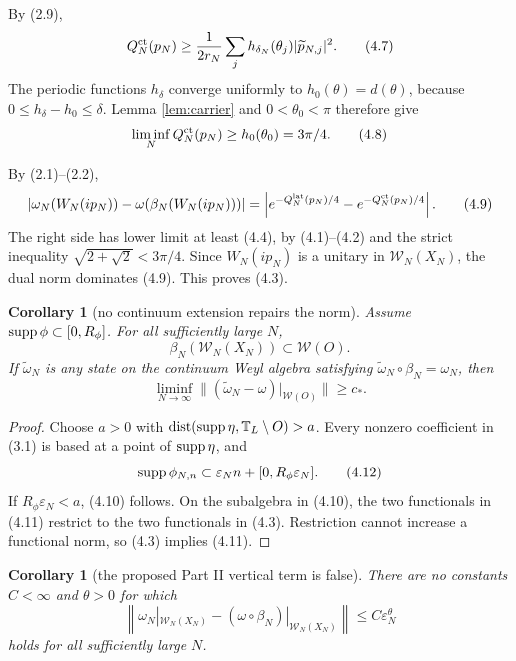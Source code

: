 \documentclass[11pt,a4paper]{article}
\newcommand{\T}{\mathbb T}
\newcommand{\W}{\mathcal W}
\newcommand{\eps}{\varepsilon}
\newtheorem{corollary}[theorem]{Corollary}
\begin{document}

By (2.9),
\[
 Q_N^{\rm ct}(p_N)
 \geq\frac1{2r_N}\sum_jh_{\delta_N}(\theta_j)
       |\widetilde p_{N,j}|^2.                                  \tag{4.7}
\]
The periodic functions $h_\delta$ converge uniformly to
$h_0(\theta)=d(\theta)$, because
$0\leq h_\delta-h_0\leq\delta$.  Lemma \ref{lem:carrier} and
$0<\theta_0<\pi$ therefore give
\[
 \liminf_NQ_N^{\rm ct}(p_N)\geq h_0(\theta_0)=3\pi/4.           \tag{4.8}
\]


By (2.1)--(2.2),
\[
 \left|\omega_N(W_N(ip_N))-\omega(\beta_N(W_N(ip_N)))\right|
 =\left|e^{-Q_N^{\rm lat}(p_N)/4}-e^{-Q_N^{\rm ct}(p_N)/4}\right|.
                                                                    \tag{4.9}
\]
The right side has lower limit at least (4.4), by (4.1)--(4.2) and the strict
inequality $\sqrt{2+\sqrt2}<3\pi/4$.  Since $W_N(ip_N)$ is a unitary in
$\W_N(X_N)$, the dual norm dominates (4.9).  This proves (4.3). \QedStep

\begin{corollary}[no continuum extension repairs the norm]\label{cor:extension}
Assume $\operatorname{supp}\phi\subset[0,R_\phi]$.  For all sufficiently large $N$,
\[
 \beta_N(\W_N(X_N))\subset\W(O).                                \tag{4.10}
\]
If $\widetilde\omega_N$ is any state on the continuum Weyl algebra satisfying
$\widetilde\omega_N\circ\beta_N=\omega_N$, then
\[
 \liminf_{N\to\infty}
 \| (\widetilde\omega_N-\omega)|_{\W(O)}\|\geq c_*.            \tag{4.11}
\]
\end{corollary}

\begin{proof}
Choose $a>0$ with $\dist(\supp\eta,\T_L\setminus O)>a$.  Every nonzero
coefficient in (3.1) is based at a point of $\operatorname{supp}\eta$, and
\[
 \supp\phi_{N,n}\subset\eps_Nn+[0,R_\phi\eps_N].               \tag{4.12}
\]
If $R_\phi\eps_N<a$, (4.10) follows.  On the subalgebra in (4.10), the two
functionals in (4.11) restrict to the two functionals in (4.3).  Restriction cannot
increase a functional norm, so (4.3) implies (4.11).
\end{proof}

\begin{corollary}[the proposed Part II vertical term is false]\label{cor:false-target}
There are no constants $C<\infty$ and $\theta>0$ for which
\[
 \left\|
 \omega_N|_{\W_N(X_N)}-(\omega\circ\beta_N)|_{\W_N(X_N)}
 \right\|\leq C\eps_N^\theta                                  \tag{4.13}
\]
holds for all sufficiently large $N$.
\end{corollary}
\end{document}
